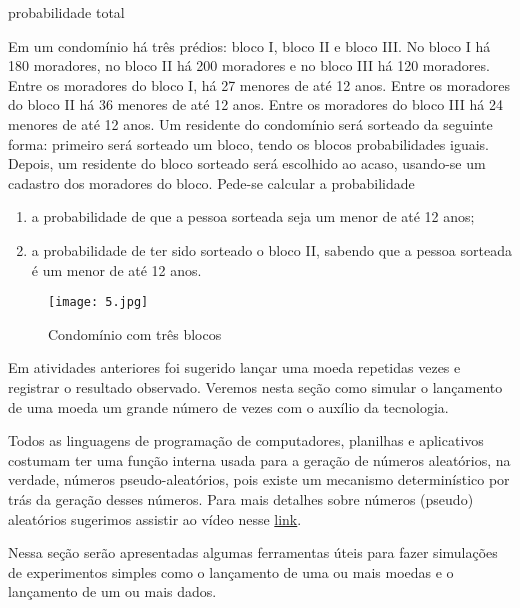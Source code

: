 \begin{task}{probabilidade total}


Em um condomínio há três prédios: bloco I, bloco II e bloco III. No bloco I há 180 moradores, no bloco II há 200 moradores e no bloco III há 120 moradores. Entre os moradores do bloco I, há 27 menores de até 12 anos. Entre os moradores do bloco II há 36 menores de até 12 anos. Entre os moradores do bloco III há 24 menores de até 12 anos. Um residente do condomínio será sorteado da seguinte forma: primeiro será sorteado um bloco, tendo os blocos probabilidades iguais.  Depois, um residente do bloco sorteado será escolhido ao acaso, usando-se um cadastro dos moradores do bloco. Pede-se calcular a probabilidade
\begin{enumerate}
\item {} 
a probabilidade de que a pessoa sorteada seja um menor de até 12 anos;

\item {} 
a probabilidade de ter sido sorteado o bloco II, sabendo que a pessoa sorteada é um menor de até 12 anos.
  
\end{enumerate}

\begin{figure}[H]
\centering

\noindent\texttt{[image: 5.jpg]}

\caption{Condomínio com três blocos}
\end{figure}

\end{task}
\know{ }

Em atividades anteriores foi sugerido lançar uma moeda repetidas vezes e registrar o resultado observado.  Veremos nesta seção como simular o lançamento de uma moeda um grande número de vezes com o auxílio da tecnologia.

Todos as linguagens de programação de computadores, planilhas e aplicativos costumam ter uma função interna usada para a geração de números aleatórios, na verdade, números pseudo-aleatórios, pois existe um mecanismo determinístico por trás da geração desses números.  Para mais detalhes sobre números (pseudo) aleatórios sugerimos assistir ao vídeo nesse  \href{https://www.youtube.com/watch?v=f4sE1r3UL4E}{link}.

Nessa seção serão apresentadas algumas ferramentas úteis para fazer simulações de experimentos simples como o lançamento de uma ou mais moedas e  o lançamento de um ou mais dados.

